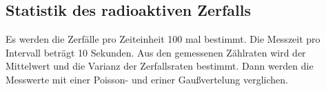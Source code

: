 \subsection{Statistik des radioaktiven Zerfalls}
Es werden die Zerfälle pro Zeiteinheit 100 mal bestimmt.
Die Messzeit pro Intervall beträgt 10 Sekunden.
Aus den gemessenen Zählraten wird der Mittelwert und die Varianz der Zerfallsraten bestimmt.
Dann werden die Messwerte mit einer Poisson- und eriner Gaußvertelung verglichen.
